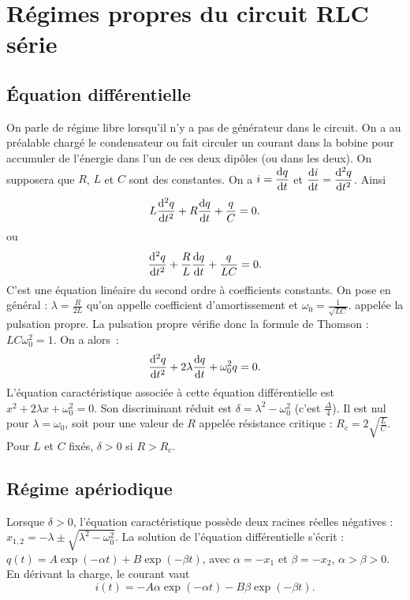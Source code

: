 \section{Régimes propres du circuit RLC série}
\subsection{Équation différentielle}
On parle de régime libre lorsqu’il n’y a pas de générateur dans le circuit. On a au préalable chargé le condensateur ou fait circuler un courant dans la bobine pour accumuler de l’énergie dans l’un de ces deux dipôles (ou dans les deux). On supposera que $R$, $L$ et $C$ sont des constantes. On a $i = \dfrac{\mathrm{d} q}{\mathrm{d} t}$ et $\dfrac{\mathrm{d} i}{\mathrm{d} t} = \dfrac{\mathrm{d}^2 q}{\mathrm{d} {t}^2}$. Ainsi
\begin{equation}
L \dfrac{\mathrm{d}^2 q}{\mathrm{d} {t}^2} + R \dfrac{\mathrm{d} q}{\mathrm{d} t} + \frac{q}{C} = 0.
\end{equation}
ou  
\begin{equation}
\dfrac{\mathrm{d}^2 q}{\mathrm{d} {t}^2} + \frac{R}{L} \dfrac{\mathrm{d} q}{\mathrm{d} t} + \frac{q}{LC} = 0.
\end{equation}
C'est une équation linéaire du second ordre à coefficients constants. On pose en général : $\lambda = \frac{R}{2L}$ qu'on appelle coefficient d'amortissement et $\omega_0 = \frac{1}{\sqrt{LC}}$. appelée la pulsation propre. La pulsation propre vérifie donc la formule de Thomson : $L C \omega_0^2 = 1$. On a alors~: 
\begin{equation}
\dfrac{\mathrm{d}^2 q}{\mathrm{d} {t}^2} + 2\lambda \dfrac{\mathrm{d} q}{\mathrm{d} t} + \omega_0^2 q = 0.
\end{equation}
L'équation caractéristique associée à cette équation différentielle est $x^2 + 2\lambda x + \omega_0^2=0$. 	Son discriminant réduit est $\delta = \lambda^2-\omega_0^2$ (c'est $\frac{\Delta}{4}$). Il est nul pour $\lambda=\omega_0$, soit pour une valeur de $R$ appelée résistance critique : $R_c = 2\sqrt{\frac{L}{C}}$. Pour $L$ et $C$ fixés, $\delta>0$ si $R > R_c$.

\subsection{Régime apériodique} Lorsque $\delta >0$, l'équation caractéristique possède deux racines réelles négatives : $x_{1, 2} = -\lambda \pm \sqrt{\lambda^2 -\omega_0^2}$. La solution de l'équation différentielle s'écrit : $q(t) = A\exp(-\alpha t) + B\exp(-\beta t)$, avec $\alpha = -x_1$ et $\beta=-x_2$, $\alpha>\beta>0$. En dérivant la charge, le courant vaut
\begin{equation}
i(t) = -A\alpha \exp{(-\alpha t)} - B\beta \exp{(-\beta t)}.
\end{equation}

